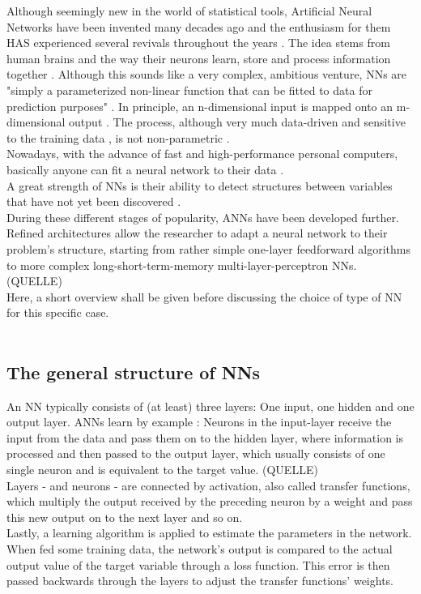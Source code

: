 \documentclass[a4paper, 11pt]{article}
\begin{document}
Although seemingly new in the world of statistical tools, Artificial Neural Networks have been invented many decades ago and the enthusiasm for them HAS experienced several revivals throughout the years \citep{Gao.2011}. The idea stems from human brains \citep{Zhang.1998} and the way their neurons learn, store and process information together \citep{Balkin.1997}. Although this sounds like a very complex, ambitious venture, NNs are "simply a parameterized non-linear function that can be fitted to data for prediction purposes" \citep{Nakamura.2005}. In principle, an n-dimensional input is mapped onto an m-dimensional output \citep{Rojas.1996}. The process, although very much data-driven \citep{Zhang.1998} and sensitive to the training data \citep{Adhikari.2015}, is not non-parametric \citep{Dorffner96neuralnetworks}. \\
 Nowadays, with the advance of fast and high-performance personal computers, basically anyone can fit a neural network to their data \citep{Gao.2011}.\\
A great strength of NNs is their ability to detect structures between variables that have not yet been discovered \citep{Zhang.1998}.\\ 
During these different stages of popularity, ANNs have been developed further. Refined architectures allow the researcher to adapt a neural network to their problem's structure, starting from rather simple one-layer feedforward algorithms to more complex long-short-term-memory multi-layer-perceptron NNs. (QUELLE)\\
Here, a short overview shall be given before discussing the choice of type of NN for this specific case.\\
\\
\subsection{The general structure of NNs}

An NN typically consists of (at least) three layers: One input, one hidden and one output layer. ANNs learn by example \citep{Balkin.1997, Gao.2011}: Neurons in the input-layer receive the input from the data and pass them on to the hidden layer, where information is processed and then passed to the output layer, which usually consists of one single neuron and is equivalent to the target value. (QUELLE)\\

Layers - and neurons - are connected by activation, also called transfer functions, which multiply the output received by the preceding neuron by a weight and pass this new output on to the next layer and so on.\\
Lastly, a learning algorithm is applied to estimate the parameters in the network. When fed some training data, the network's output is compared to the actual output value of the target variable through a loss function. This error is then passed backwards through the layers to adjust the transfer functions' weights.
\end{document}
